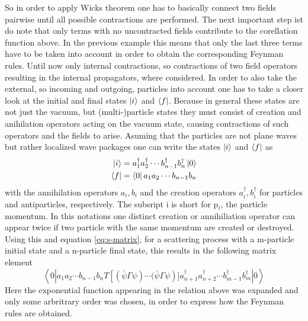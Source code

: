 So in order to apply Wicks theorem one has to basically connect two fields pairwise until all possible contractions are performed. \newline
The next important step ist do note that only terms with no uncontracted fields contribute to the corellation function above. In the previous example this means that only the last three terms have to be taken into account in order to obtain the corresponding Feynman rules. \newline
Until now only internal contractions, so contractions of two field operators resulting in the internal propagators, where considered. In order to also take the external, so incoming and outgoing, particles into account one has to take a closer look at the initial and final states $\ket{i}$ and $\bra{f}$. Because in general these states are not just the vacuum, but (multi-)particle states they must consist of creation and anihilation operators acting on the vacuum state, causing contractions of such operators and the fields to arise. Asuming that the particles are not plane waves but rather localized wave packages one can write the states $\ket{i}$ and $\bra{f}$ as\cite{Kopp:2016}
\begin{align*}
\ket{i}=a_1^\dagger a_2^\dagger \cdots b_{n-1}^\dagger b_n^\dagger \ket{0}
\\
\bra{f}=\bra{0}a_1 a_2 \cdots b_{n-1}b_n
\end{align*}
with the annihilation operators $a_i,b_i$ and the creation operators $a_i^\dagger,b_i^\dagger$ for particles and antiparticles, respectively. The subsript i is short for p$_i$, the particle momentum. In this notations one distinct creation or annihiliation operator can appear twice if two particle with the same momentum are created or destroyed. \newline
Using this and equation \ref{eq:s-matrix}, for a scattering process with a m-particle initial state and a n-particle final state, this results in the following matrix element \cite[Eq. 2.2]{Denner:1992vza}
\begin{equation}
\left<0\left|a_1 a_2 \cdots  b_{n-1} b_n T\left[\left(\bar{\psi}\Gamma\psi\right)\cdots(\bar{\psi}\Gamma\psi\right)]a_{n+1}^\dagger a_{n+2}^\dagger \cdots  b_{m-1}^\dagger b_m^\dagger\right|0\right>
\label{eq:matrix_element}
\end{equation}
Here the exponential function appearing in the relation above was expanded and only some arbritrary order was chosen, in order to express how the Feynman rules are obtained.\newline
